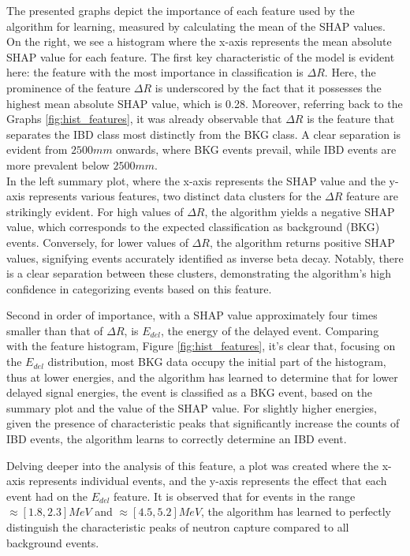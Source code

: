 The presented graphs depict the importance of each feature used by the algorithm for learning, measured by calculating the mean of the SHAP values. On the right, we see a histogram where the x-axis represents the mean absolute SHAP value for each feature. The first key characteristic of the model is evident here: the feature with the most importance in classification is $\Delta R$. Here, the prominence of the feature $\Delta R$ is underscored by the fact that it possesses the highest mean absolute SHAP value, which is 0.28. Moreover, referring back to the Graphs \ref{fig:hist_features}, it was already observable that $\Delta R$ is the feature that separates the IBD class most distinctly from the BKG class. A clear separation is evident from $2500 mm$ onwards, where BKG events prevail, while IBD events are more prevalent below $2500 mm$. \\

In the left summary plot, where the x-axis represents the SHAP value and the y-axis represents various features, two distinct data clusters for the \(\Delta R\) feature are strikingly evident. For high values of \(\Delta R\), the algorithm yields a negative SHAP value, which corresponds to the expected classification as background (BKG) events. Conversely, for lower values of \(\Delta R\), the algorithm returns positive SHAP values, signifying events accurately identified as inverse beta decay. Notably, there is a clear separation between these clusters, demonstrating the algorithm's high confidence in categorizing events based on this feature.

Second in order of importance, with a SHAP value approximately four times smaller than that of $\Delta R$, is $E_{del}$, the energy of the delayed event. Comparing with the feature histogram, Figure \ref{fig:hist_features}, it's clear that, focusing on the $E_{del}$ distribution, most BKG data occupy the initial part of the histogram, thus at lower energies, and the algorithm has learned to determine that for lower delayed signal energies, the event is classified as a BKG event, based on the summary plot and the value of the SHAP value. For slightly higher energies, given the presence of characteristic peaks that significantly increase the counts of IBD events, the algorithm learns to correctly determine an IBD event. 

Delving deeper into the analysis of this feature, a plot was created where the x-axis represents individual events, and the y-axis represents the effect that each event had on the $E_{del}$ feature. It is observed that for events in the range $\approx[1.8, 2.3] MeV$ and $\approx[4.5, 5.2] MeV$, the algorithm has learned to perfectly distinguish the characteristic peaks of neutron capture compared to all background events.

